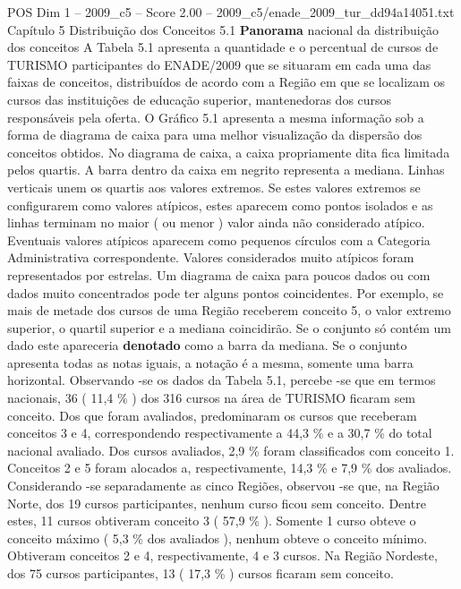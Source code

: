 \begin{textsample}{POS Dim 1 – 2009\_c5 – Score 2.00 – 2009\_c5/enade\_2009\_tur\_dd94a14051.txt}  \label{ex:f1_pos_141}
Capítulo 5 Distribuição dos Conceitos 5.1 \textbf{Panorama} nacional da distribuição dos conceitos A Tabela 5.1 apresenta a quantidade e o percentual de cursos de TURISMO participantes do ENADE/2009 que se situaram em cada uma das faixas de conceitos, distribuídos de acordo com a Região em que se localizam os cursos das instituições de educação superior, mantenedoras dos cursos responsáveis pela oferta.
O Gráfico 5.1 apresenta a mesma informação sob a forma de diagrama de caixa para uma melhor visualização da dispersão dos conceitos obtidos.
No diagrama de caixa, a caixa propriamente dita fica limitada pelos quartis.
A barra dentro da caixa em negrito representa a mediana.
Linhas verticais unem os quartis aos valores extremos.
Se estes valores extremos se configurarem como valores atípicos, estes aparecem como pontos isolados e as linhas terminam no maior ( ou menor ) valor ainda não considerado atípico.
Eventuais valores atípicos aparecem como pequenos círculos com a Categoria Administrativa correspondente.
Valores considerados muito atípicos foram representados por estrelas.
Um diagrama de caixa para poucos dados ou com dados muito concentrados pode ter alguns pontos coincidentes.
Por exemplo, se mais de metade dos cursos de uma Região receberem conceito 5, o valor extremo superior, o quartil superior e a mediana coincidirão.
Se o conjunto só contém um dado este apareceria \textbf{denotado} como a barra da mediana.
Se o conjunto apresenta todas as notas iguais, a notação é a mesma, somente uma barra horizontal.
Observando -se os dados da Tabela 5.1, percebe -se que em termos nacionais, 36 ( 11,4 \% ) dos 316 cursos na área de TURISMO ficaram sem conceito.
Dos que foram avaliados, predominaram os cursos que receberam conceitos 3 e 4, correspondendo respectivamente a 44,3 \% e a 30,7 \% do total nacional avaliado.
Dos cursos avaliados, 2,9 \% foram classificados com conceito 1.
Conceitos 2 e 5 foram alocados a, respectivamente, 14,3 \% e 7,9 \% dos avaliados.
Considerando -se separadamente as cinco Regiões, observou -se que, na Região Norte, dos 19 cursos participantes, nenhum curso ficou sem conceito.
Dentre estes, 11 cursos obtiveram conceito 3 ( 57,9 \% ).
Somente 1 curso obteve o conceito máximo ( 5,3 \% dos avaliados ), nenhum obteve o conceito mínimo.
Obtiveram conceitos 2 e 4, respectivamente, 4 e 3 cursos.
Na Região Nordeste, dos 75 cursos participantes, 13 ( 17,3 \% ) cursos ficaram sem conceito.

\end{textsample}
